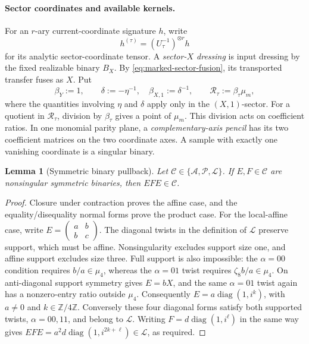 \documentclass[11pt,letterpaper,onecolumn]{article}
\theoremstyle{plain}
\newtheorem{lemma}[lemma]{Lemma}
\theoremstyle{definition}
\theoremstyle{remark}
\newcommand{\cA}{\mathscr A}
\newcommand{\cP}{\mathscr P}
\newcommand{\cL}{\mathscr L}
\newcommand{\cC}{\mathscr C}
\newcommand{\diag}{\operatorname{diag}}
\begin{document}
\paragraph{Sector coordinates and available kernels.}
For an \(r\)-ary current-coordinate signature \(h\), write
\[
 h^{(\tau)}=(U_\tau^{-1})^{\otimes r}h
\]
for its analytic sector-coordinate tensor.  A \emph{sector-\(X\) dressing} is input dressing by the fixed realizable binary \(B_X\). By
\cref{eq:marked-sector-fusion}, its transported transfer fuses as \(X\).
Put
\[
 \beta_{Y}:=1,
 \qquad
 \delta:=-\eta^{-1},\quad
 \beta_{X,1}:=\delta^{-1},
 \qquad
 \mathscr R_\tau:=\beta_\tau\mu_m,
\]
where the quantities involving \(\eta\) and \(\delta\) apply only in the
\((X,1)\)-sector.  For a quotient in \(\mathscr R_\tau\), division
by \(\beta_\tau\) gives a point of \(\mu_m\).  This division acts on coefficient ratios.  In one monomial parity plane, a
\emph{complementary-axis pencil} has its two coefficient matrices on
the two coordinate axes.  A sample with exactly one vanishing coordinate
is a singular binary.

\begin{lemma}[Symmetric binary pullback]
\label{lem:symmetric-binary-pullback}
Let \(\cC\in\{\cA,\cP,\cL\}\).  If
\(E,F\in\cC\) are nonsingular symmetric binaries, then
\(EFE\in\cC\).
\end{lemma}

\begin{proof}
Closure under contraction proves the affine case, and the
equality/disequality normal forms prove the product case.  For the
local-affine case, write
\(E=\left(\begin{smallmatrix}a&b\\b&c\end{smallmatrix}\right)\).
The diagonal twists in the definition of \(\cL\) preserve support, which
must be affine.  Nonsingularity excludes support size one, and affine
support excludes size three.  Full support is also impossible: the
\(\alpha=00\) condition requires \(b/a\in\mu_4\), whereas the
\(\alpha=01\) twist requires \(\zeta_8 b/a\in\mu_4\).
On anti-diagonal support symmetry gives \(E=bX\), and the same
\(\alpha=01\) twist again has a nonzero-entry ratio outside \(\mu_4\).
Consequently \(E=a\diag(1,i^k)\), with \(a\ne0\) and
\(k\in\mathbb Z/4\mathbb Z\).  Conversely these four diagonal forms
satisfy both supported twists, \(\alpha=00,11\), and belong to \(\cL\).
Writing \(F=d\diag(1,i^\ell)\) in the same way gives
\(EFE=a^2d\diag(1,i^{2k+\ell})\in\cL\), as required.
\end{proof}
\end{document}
